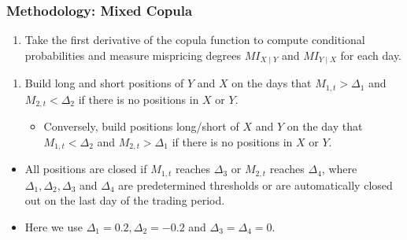 \documentclass[pdf,9pt,xcolor=dvipsnames,hide notes]{beamer}
\begin{document}
\begin{frame}
\frametitle{Methodology: Mixed Copula}

	\begin{enumerate}[(3)]
	\justifying
	
	
	\pause
		
		\item Take the first derivative of the copula function to compute conditional
		probabilities and measure mispricing degrees $MI_{X\mid Y}$ and $MI_{Y\mid X}$ for each day.
		
		
		\vspace{0.3cm}
		
	\end{enumerate}

	\pause
	\begin{enumerate}[(4)]
	\justifying
		
		\item Build long and short positions of $Y$ and $X$ on the days that $M_{1,t}>\Delta_{1}$ and $M_{2,t}<\Delta_{2}$ if there is no positions in $X$ or $Y$. 
		
		\vspace{0.1cm}
		\begin{itemize}
			\item Conversely, build positions long/short of $X$ and $Y$ on the day that $M_{1,t}<\Delta_{2}$ and $M_{2,t}>\Delta_{1}$ if there is no positions in $X$ or $Y$.
		\end{itemize}
		
	\end{enumerate}

	\pause
		\begin{itemize}
	\item  All positions are closed if $M_{1,t}$ reaches $\Delta_{3}$ or $M_{2,t}$ reaches $\Delta_{4}$, where $\Delta_{1},\Delta_{2},\Delta_{3}$ and $\Delta_{4}$ are predetermined thresholds or are automatically closed out on the last day of the trading period. 
	
	
	\vspace{0.3cm}
	\pause
	
	\item Here we use $\Delta_{1}=0.2, \Delta_{2}=-0.2$ and $\Delta_{3}=\Delta_{4}=0$.
	
	\end{itemize}
	
\end{frame}
\end{document}

